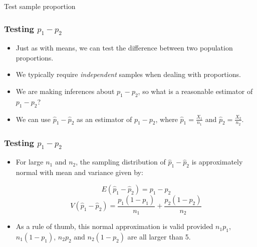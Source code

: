 \documentclass[12pt]{beamer}
\begin{document}
	\begin{frame}
		\vspace{1cm}
		\centering
		{\color{blue}\large Test sample proportion}
		
	\end{frame}
	\begin{frame}
		\frametitle{Testing $p_1 - p_2$}
		
		\begin{itemize}[label={\color{blue}$\blacktriangleright$}]
			\item Just as with means, we can test the difference between two population proportions.
			
			\item We typically require \emph{independent} samples when dealing with proportions.
			
			\item We are making inferences about $p_1 - p_2$, so what is a reasonable estimator of $p_1 - p_2$?
			
			\item We can use $\hat{p}_1 - \hat{p}_2$ as an estimator of $p_1 - p_2$, where $\hat{p}_1 = \frac{X_1}{n_1}$ and $\hat{p}_2 = \frac{X_2}{n_2}$.
		\end{itemize}
		
	\end{frame}
	\begin{frame}
		\frametitle{Testing $p_1 - p_2$}
		
		\begin{itemize}[label={\color{blue}$\blacktriangleright$}]
			\item For large $n_1$ and $n_2$, the sampling distribution of $\hat{p}_1 - \hat{p}_2$ is approximately normal with mean and variance given by:
			
			\vspace{0.5cm}
			
			\[
			E(\hat{p}_1 - \hat{p}_2) = p_1 - p_2
			\]
			\[
			V(\hat{p}_1 - \hat{p}_2) = \frac{p_1(1-p_1)}{n_1} + \frac{p_2(1-p_2)}{n_2}
			\]
			
			\vspace{0.5cm}
			
			\item As a rule of thumb, this normal approximation is valid provided $n_1p_1$, $n_1(1-p_1)$, $n_2p_2$ and $n_2(1-p_2)$ are all larger than 5.
		\end{itemize}
		
	\end{frame}
\end{document}
